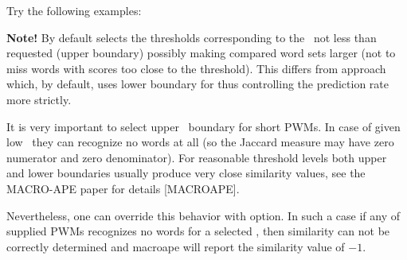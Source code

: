 Try the following examples:


{\small
\textbf{Note!} By default  selects the thresholds corresponding to the \pvalue\ not 
less than requested (upper boundary) possibly making compared word sets larger (not to miss words with scores too close to the threshold).
This differs from  approach which, by default, uses 
lower boundary for \pvalue thus controlling the prediction rate more strictly.

It is very important to select upper \pvalue\ boundary for short PWMs. In case of given 
low \pvalues\ they can recognize no words at all (so the Jaccard measure may have zero 
numerator and zero denominator). For reasonable threshold levels both upper and lower 
boundaries usually produce very close similarity values, see the MACRO-APE paper for details [MACROAPE].

Nevertheless, one can override this behavior with  option. In such a case if 
any of supplied PWMs recognizes no words for a selected \pvalue, then similarity can not be 
correctly determined and macroape will report the similarity value of $-1$. 
}
